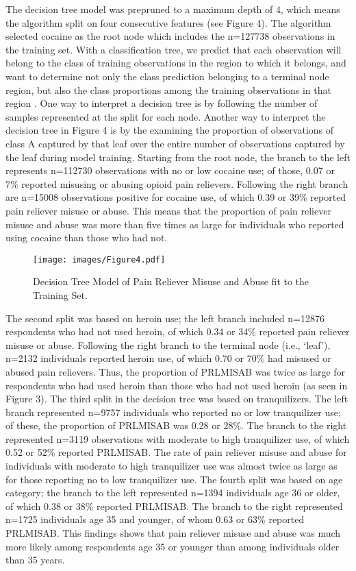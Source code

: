 \documentclass[sigconf]{acmart}
\begin{document}
The decision tree model was prepruned to a maximum depth of 4, which means 
the algorithm split on four consecutive features (see Figure 4). The  
algorithm selected cocaine as the root node which includes the n=127738 
observations in the training set. With a classification tree, we predict 
that each observation will belong to the class of training observations in 
the region to which it belongs, and want to determine not only the class
prediction belonging to a terminal node region, but also the class 
proportions among the training observations in that region \cite{james13}. 
One way to interpret a decision tree is by following the number of samples 
represented at the split for each node. Another way to interpret the decision 
tree in Figure 4 is by the examining the proportion of observations of 
class A captured by that leaf over the entire number of observations captured 
by the leaf during model training. Starting from the root node, the branch 
to the left represents n=112730 observations with no or low cocaine use; 
of those, 0.07 or 7\% reported misusing or abusing opioid pain relievers. 
Following the right branch are n=15008 observations positive for cocaine use, 
of which 0.39 or 39\% reported pain reliever misuse or abuse. This means that 
the proportion of pain reliever misuse and abuse was more than five times as 
large for individuals who reported using cocaine than those who had not. 

\begin{figure}[!ht]
  \centering\texttt{[image: images/Figure4.pdf]}
  \caption{Decision Tree Model of Pain Reliever Misuse and Abuse
  fit to the Training Set.}
  \label{f:Figure4}
\end{figure}

The second split was based on heroin use; the left branch included n=12876 
respondents who had not used heroin, of which 0.34 or 34\% reported pain
reliever misuse or abuse. Following the right branch to the terminal node 
(i.e., `leaf'), n=2132 individuals reported heroin use, of which 0.70 or 
70\% had misused or abused pain relievers. Thus, the proportion of PRLMISAB 
was twice as large for respondents who had used heroin than those who had 
not used heroin (as seen in Figure 3). The third split in the decision tree
was based on tranquilizers. The left branch represented n=9757 individuals 
who reported no or low tranquilizer use; of these, the proportion of 
PRLMISAB was 0.28 or 28\%. The branch to the right represented n=3119 
observations with moderate to high tranquilizer use, of which 0.52 or 52\% 
reported PRLMISAB. The rate of pain reliever misuse and abuse for individuals 
with moderate to high tranquilizer use was almost twice as large as for 
those reporting no to low tranquilizer use. The fourth split was based on age 
category; the branch to the left represented n=1394 individuals age 36 or older, 
of which 0.38 or 38\% reported PRLMISAB. The branch to the right represented 
n=1725 individuals age 35 and younger, of whom 0.63 or 63\% reported PRLMISAB. 
This findings shows that pain reliever misuse and abuse was much more likely
among respondents age 35 or younger than among individuals older than 35 years. 
\end{document}
